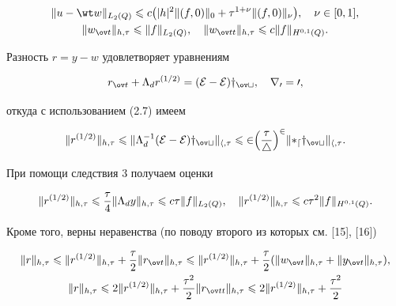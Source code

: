 \begin{pf}
\begin{gather}


\|u-\wt w\|_{L_2(Q)}\lee c\big(|h|^2\|(f,0)\|_0+


\tau^{1+\nu}\|(f,0)\|_\nu\big),\quad \nu\in [0,1],\\


\|w_{\ov t}\|_{h,\tau}\lee \|f\|_{L_2(Q)},\quad


\|w_{\ov tt}\|_{h,\tau}\lee c \|f\|_{H^{0,1}(Q)}.


\end{gather}


Разность $r=y-w$ удовлетворяет уравнениям


$$


r_{\ov t}+\Lambda_d r^{(1/2)}=(\cal E-E)y_{\ov t},\quad r_0=0,


$$


откуда с использованием (2.7) имеем


$$


\|r^{(1/2)}\|_{h,\tau}\lee \|\Lambda_d^{-1}(\cal E-E)


y_{\ov t}\|_{h,\tau}\lee 2\Big(\frac{\tau}{4}\Big)^2


\|\Lambda_dy_{\ov t}\|_{h,\tau}.


$$


При помощи следствия 3 получаем оценки


\begin{equation}


\|r^{(1/2)}\|_{h,\tau}\lee \frac{\tau}{4}\|\Lambda_d y\|_{h,\tau}


\lee c\tau\|f\|_{L_2(Q)},\quad


\|r^{(1/2)}\|_{h,\tau}\lee c\tau^2\|f\|_{H^{0,1}(Q)}.


\end{equation}


Кроме того, верны неравенства (по поводу второго из которых см. [15], [16])


\begin{gather*}


\|r\|_{h,\tau}\lee \|r^{(1/2)}\|_{h,\tau}+\frac{\tau}{2}


\|r_{\ov t}\|_{h,\tau}\lee \|r^{(1/2)}\|_{h,\tau}+\frac{\tau}{2}


(\|w_{\ov t}\|_{h,\tau}+\|y_{\ov t}\|_{h,\tau}),\\


\|r\|_{h,\tau}\lee 2\|r^{(1/2)}\|_{h,\tau}+\frac{\tau^2}{2}


\|r_{\ov tt}\|_{h,\tau}\lee 2\|r^{(1/2)}\|_{h,\tau}+\frac{\tau^2}{2}



\end{gather*}
\end{pf}
